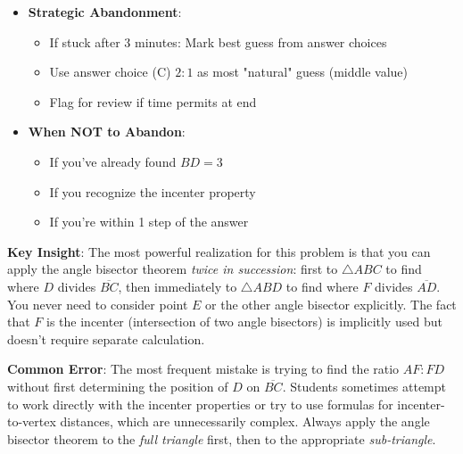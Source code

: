 \documentclass[12pt]{article}
\begin{document}
\begin{competitionbox}
\begin{itemize}[leftmargin=*]
    \item \textbf{Strategic Abandonment}:
    \begin{itemize}
        \item If stuck after 3 minutes: Mark best guess from answer choices
        \item Use answer choice (C) $2:1$ as most "natural" guess (middle value)
        \item Flag for review if time permits at end
    \end{itemize}
    
    \item \textbf{When NOT to Abandon}:
    \begin{itemize}
        \item If you've already found $BD = 3$
        \item If you recognize the incenter property
        \item If you're within 1 step of the answer
    \end{itemize}
\end{itemize}
\end{competitionbox}

\vspace{0.5cm}

\begin{keyinsightbox}
\textbf{Key Insight}: The most powerful realization for this problem is that you can apply the angle bisector theorem \emph{twice in succession}: first to $\triangle ABC$ to find where $D$ divides $\overline{BC}$, then immediately to $\triangle ABD$ to find where $F$ divides $\overline{AD}$. You never need to consider point $E$ or the other angle bisector explicitly. The fact that $F$ is the incenter (intersection of two angle bisectors) is implicitly used but doesn't require separate calculation.
\end{keyinsightbox}

\vspace{0.3cm}

\begin{warningbox}
\textbf{Common Error}: The most frequent mistake is trying to find the ratio $AF:FD$ without first determining the position of $D$ on $\overline{BC}$. Students sometimes attempt to work directly with the incenter properties or try to use formulas for incenter-to-vertex distances, which are unnecessarily complex. Always apply the angle bisector theorem to the \emph{full triangle} first, then to the appropriate \emph{sub-triangle}.
\end{warningbox}
\end{document}
